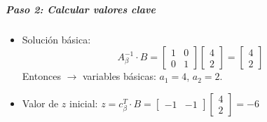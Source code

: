 \subparagraph{Paso 2: Calcular valores clave}
\begin{itemize}
  \item Solución básica:
   \[
   A_\beta^{-1} \cdot B = \begin{bmatrix} 1 & 0 \\ 0 & 1 \end{bmatrix} \begin{bmatrix} 4 \\ 2 \end{bmatrix} = \begin{bmatrix} 4 \\ 2 \end{bmatrix}
   \]
   Entonces \(\rightarrow\) variables básicas: \(a_1 = 4\), \(a_2 = 2\).

  \item Valor de \(z\) inicial:
   \(
   z = c_\beta^T \cdot B = \begin{bmatrix} -1 & -1 \end{bmatrix} \begin{bmatrix} 4 \\ 2 \end{bmatrix} = -6
   \)


\end{itemize}
